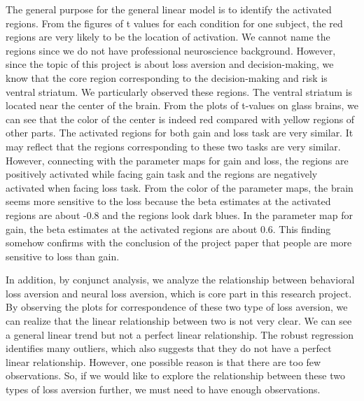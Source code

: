 \par \indent The general purpose for the general linear model is to identify the activated regions. From the figures of t values for each condition for one subject, the red regions are very likely to be the location of activation. We cannot name the regions since we do not have professional neuroscience background. However, since the topic of this project is about loss aversion and decision-making, we know that the core region corresponding to the decision-making and risk is ventral striatum. We particularly observed these regions. The ventral striatum is located near the center of the brain. From the plots of t-values on glass brains, we can see that the color of the center is indeed red compared with yellow regions of other parts. The activated regions for both gain and loss task are very similar. It may reflect that the regions corresponding to these two tasks are very similar. However, connecting with the parameter maps for gain and loss, the regions are positively activated while facing gain task and the regions are negatively activated when facing loss task. From the color of the parameter maps, the brain seems more sensitive to the loss because the beta estimates at the activated regions are about -0.8 and the regions look dark blues. In the parameter map for gain, the beta estimates at the activated regions are about 0.6. This finding somehow confirms with the conclusion of the project paper that people are more sensitive to loss than gain. 

\par \indent In addition, by conjunct analysis, we analyze the relationship between behavioral loss aversion and neural loss aversion, which is core part in this research project. By observing the plots for correspondence of these two type of loss aversion, we can realize that the linear relationship between two is not very clear. We can see a general linear trend but not a perfect linear relationship. The robust regression identifies many outliers, which also suggests that they do not have a perfect linear relationship. However, one possible reason is that there are too few observations. So, if we would like to explore the relationship between these two types of loss aversion further, we must need to have enough observations.